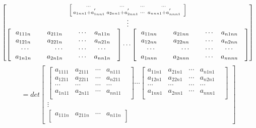 \documentclass[twoside,a4paper,CCT]{cctart}   %
\begin{document}
\begin{define}
\begin{list}{}
$$\begin{bmatrix}
\begin{bmatrix}
\begin{smallmatrix}
  \cdots&\cdots&\cdots &\cdots& \\
 a_{1nn1} + a_{1nn1}^{'}& a_{2nn1} + a_{2nn1}^{'}&\cdots&a_{nnn1} + a_{nnn1}^{'}\\
 \end{smallmatrix}\end{bmatrix}\\
\vdots\\
\begin{bmatrix}
  \ \ a_{111n}\ \ \ \ & a_{211n}\ \ \ \ &\cdots&a_{n11n}\\
  \ \ a_{121n}\ \ \ \ & a_{221n}\ \ \ \ &\cdots&a_{n21n}\\
  \cdots&\cdots&\cdots &\cdots& \\
  \ \ a_{1n1n}\ \ \ \ & a_{2n1n}\ \ \ \ &\cdots&a_{nn1n}\\
  \end{bmatrix}
\cdots
\begin{bmatrix}
  \ \ a_{11nn}\ \ \ \ & a_{21nn}\ \ \ \ &\cdots&a_{n1nn}\\
  \ \ a_{12nn}\ \ \ \ & a_{22nn}\ \ \ \ &\cdots&a_{n2nn}\\
  \cdots&\cdots&\cdots &\cdots& \\
   \ \ a_{1nnn}\ \ \ \ & a_{2nnn}\ \ \ \ &\cdots&a_{nnnn}\\
\end{bmatrix}
\end{bmatrix}\\
\\$$
$$=det\begin{bmatrix}
 \begin{bmatrix}
   a_{1111}& a_{2111}&\cdots&a_{n111}\\
   a_{1211}& a_{2211}&\cdots&a_{n211}\\
  \cdots&\cdots&\cdots &\cdots& \\
a_{1n11}& a_{2n11}&\cdots&a_{nn11}\\
\end{bmatrix}
\cdots
\begin{bmatrix}
  a_{11n1}& a_{21n1}&\cdots&a_{n1n1}\\
  a_{12n1}& a_{22n1}&\cdots&a_{n2n1}\\
  \cdots&\cdots&\cdots &\cdots& \\
 a_{1nn1}& a_{2nn1}&\cdots&a_{nnn1}\\
 \end{bmatrix}\\
\vdots\\
\begin{bmatrix}
  a_{111n}& a_{211n}&\cdots&a_{n11n}\\

\end{bmatrix}
\end{bmatrix}$$
\end{list}
\end{define}
\end{document}
